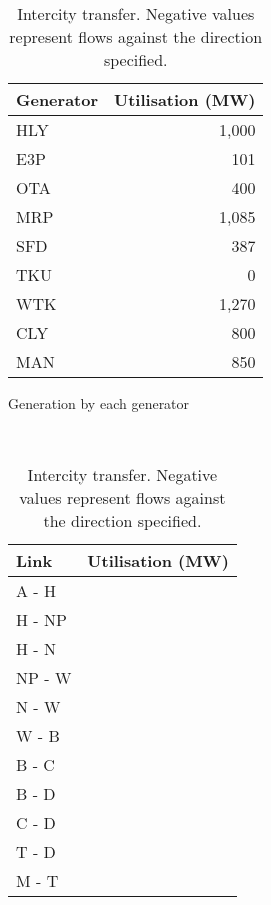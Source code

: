 \documentclass[11pt]{article}
\begin{document}
\begin{table}[h]
	\begin{minipage}{0.5\linewidth}
		\centering
		\begin{tabular}{@{}lr@{}}
		\toprule
		Generator & Utilisation (MW) \\ \midrule
		HLY       & 1,000             \\
		E3P       & 101               \\
		OTA       & 400              \\
		MRP       & 1,085             \\
		SFD       & 387              \\
		TKU       & 0                \\
		WTK       & 1,270             \\
		CLY       & 800              \\
		MAN       & 850              \\ \bottomrule
		\end{tabular}
		\caption{Generation by each generator}
	\end{minipage}
	~
	\begin{minipage}{0.5\linewidth}
		\centering
		\begin{tabular}{@{}lr@{}}
		\toprule
		Link & Utilisation (MW) \\ \midrule
		A - H       & \color{red}{$-451$}            \\ %
		H - NP      & \color{red}{$-284$}            \\ %
		H - N       & \color{ForestGreen}{$196$}     \\ %
		NP - W      & \color{ForestGreen}{$43$}      \\ %
		N - W       & \color{red}{$-88$}            \\ %
		W - B       & \color{red}{$-1000$}           \\ %
		B - C       & \color{ForestGreen}{$292.2$}     \\ %
		B - D       & \color{red}{$-22.2$}              \\ %
		C - D       & \color{red}{$-785.8$}            \\ %
		T - D       & \color{ForestGreen}{$233$}         \\ %
		M - T       & \color{ForestGreen}{$850$}            \\ \bottomrule
		\end{tabular}
		\caption{Intercity transfer. Negative values represent flows against the direction specified.}
	\end{minipage}
\end{table}
\end{document}
